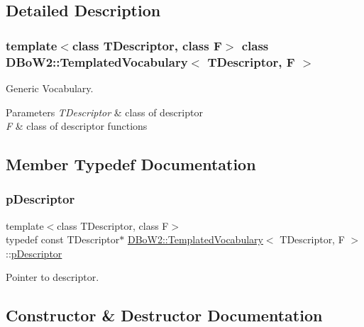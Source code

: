 \subsection{Detailed Description}
\subsubsection*{template$<$class T\+Descriptor, class F$>$\newline
class D\+Bo\+W2\+::\+Templated\+Vocabulary$<$ T\+Descriptor, F $>$}

Generic Vocabulary. 


\begin{DoxyParams}{Parameters}
{\em T\+Descriptor} & class of descriptor \\
\hline
{\em F} & class of descriptor functions \\
\hline
\end{DoxyParams}


\subsection{Member Typedef Documentation}
\mbox{\label{class_d_bo_w2_1_1_templated_vocabulary_a40913d67e369e6993c2eab80a968f829}} 
\subsubsection{\texorpdfstring{p\+Descriptor}{pDescriptor}}
{\footnotesize\ttfamily template$<$class T\+Descriptor, class F$>$ \\
typedef const T\+Descriptor$\ast$ \mbox{\hyperlink{class_d_bo_w2_1_1_templated_vocabulary}{D\+Bo\+W2\+::\+Templated\+Vocabulary}}$<$ T\+Descriptor, F $>$\+::\mbox{\hyperlink{class_d_bo_w2_1_1_templated_vocabulary_a40913d67e369e6993c2eab80a968f829}{p\+Descriptor}}\hspace{0.3cm}{\ttfamily [protected]}}



Pointer to descriptor. 



\subsection{Constructor \& Destructor Documentation}
\mbox{\label{class_d_bo_w2_1_1_templated_vocabulary_a0dbbcb6bf766b09f08d945a2af0dbea8}} 

